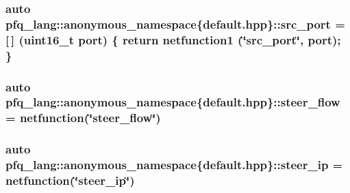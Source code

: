 \hypertarget{namespacepfq__lang_1_1anonymous__namespace_02default_8hpp_03_ad4d03d1e69ba9608a2d87ac91a2b521f}{
\subsubsection[{src\-\_\-port}]{\setlength{\rightskip}{0pt plus 5cm}auto pfq\-\_\-lang\-::anonymous\-\_\-namespace\{default.\-hpp\}\-::src\-\_\-port = \mbox{[}$\,$\mbox{]} (uint16\-\_\-t {\bf port}) \{ return {\bf netfunction1} (\char`\"{}src\-\_\-port\char`\"{}, port); \}}}\label{namespacepfq__lang_1_1anonymous__namespace_02default_8hpp_03_ad4d03d1e69ba9608a2d87ac91a2b521f}
\hypertarget{namespacepfq__lang_1_1anonymous__namespace_02default_8hpp_03_aee7b4eb8c316f9c0cd6ee7bc22b517ef}{
\subsubsection[{steer\-\_\-flow}]{\setlength{\rightskip}{0pt plus 5cm}auto pfq\-\_\-lang\-::anonymous\-\_\-namespace\{default.\-hpp\}\-::steer\-\_\-flow = {\bf netfunction}(\char`\"{}steer\-\_\-flow\char`\"{})}}\label{namespacepfq__lang_1_1anonymous__namespace_02default_8hpp_03_aee7b4eb8c316f9c0cd6ee7bc22b517ef}
\hypertarget{namespacepfq__lang_1_1anonymous__namespace_02default_8hpp_03_ab44cbea49db522460c5bce82d04280cd}{
\subsubsection[{steer\-\_\-ip}]{\setlength{\rightskip}{0pt plus 5cm}auto pfq\-\_\-lang\-::anonymous\-\_\-namespace\{default.\-hpp\}\-::steer\-\_\-ip = {\bf netfunction}(\char`\"{}steer\-\_\-ip\char`\"{})}}\label{namespacepfq__lang_1_1anonymous__namespace_02default_8hpp_03_ab44cbea49db522460c5bce82d04280cd}
